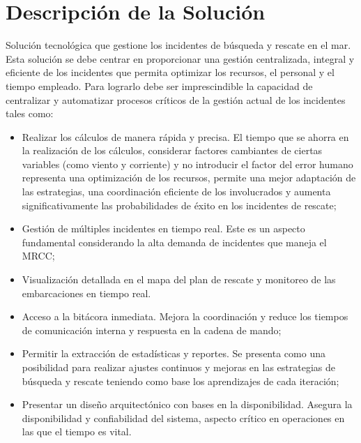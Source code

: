 \section{Descripción de la Solución}\label{sec:descriptionDeLaSolucion}


Solución tecnológica que gestione los incidentes de búsqueda y rescate en el mar. Esta solución se debe centrar en proporcionar una gestión 
centralizada, integral y eficiente de los incidentes que permita optimizar los recursos, el personal y el tiempo empleado. Para lograrlo debe 
ser imprescindible la capacidad de centralizar y automatizar procesos críticos de la gestión actual de los incidentes tales como: 

\begin{itemize}
    \item Realizar los cálculos de manera rápida y precisa. 
    El tiempo que se ahorra en la realización de los cálculos, considerar factores cambiantes de ciertas variables (como viento y corriente) 
    y no introducir el factor del error humano representa una optimización de los recursos, permite una mejor adaptación de las estrategias, 
    una coordinación eficiente de los involucrados y aumenta significativamente las probabilidades de éxito en los incidentes de rescate;
    \item Gestión de múltiples incidentes en tiempo real. Este es un aspecto fundamental considerando la alta demanda de incidentes que maneja el MRCC;
    \item Visualización detallada en el mapa del plan de rescate y monitoreo de las embarcaciones en tiempo real. 
    \item Acceso a la bitácora inmediata. Mejora la coordinación y reduce los tiempos de comunicación interna y respuesta en la cadena de mando;
    \item Permitir la extracción de estadísticas y reportes. Se presenta como una posibilidad para realizar ajustes continuos y mejoras en las estrategias 
    de búsqueda y rescate teniendo como base los aprendizajes de cada iteración;
    \item Presentar un diseño arquitectónico con bases en la disponibilidad. Asegura la disponibilidad y confiabilidad del sistema, aspecto crítico en operaciones 
    en las que el tiempo es vital.
\end{itemize}